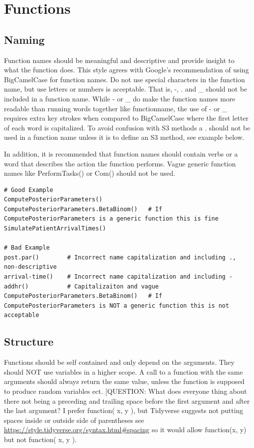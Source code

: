\documentclass[
]{book}
\begin{document}
\hypertarget{functions}{%
\chapter{Functions}\label{functions}}

\hypertarget{naming}{%
\section{Naming}\label{naming}}

Function names should be meaningful and descriptive and provide insight to what the function does. This style agrees with Google's recommendation of using BigCamelCase for function names. Do not use special characters in the function name, but use letters or numbers is acceptable. That is, -, . and \_ should not be included in a function name. While - or \_ do make the function names more readable than running words together like functionname, the use of - or \_ requires extra key strokes when compared to BigCamelCase where the first letter of each word is capitalized. To avoid confusion with S3 methods a . should not be used in a function name unless it is to define an S3 method, see example below.

In addition, it is recommended that function names should contain verbs or a word that describes the action the function performs. Vague generic function names like PerformTasks() or Com() should not be used.

\begin{verbatim}
# Good Example 
ComputePosteriorParameters()
ComputePosteriorParameters.BetaBinom()   # If ComputePosteriorParameters is a generic function this is fine
SimulatePatientArrivalTimes()

# Bad Example
post.par()        # Incorrect name capitalization and including ., non-descriptive
arrival-time()    # Incorrect name capitalization and including -
addhr()           # Capitalizaiton and vague
ComputePosteriorParameters.BetaBinom()   # If ComputePosteriorParameters is NOT a generic function this is not acceptable
\end{verbatim}

\hypertarget{structure}{%
\section{Structure}\label{structure}}

Functions should be self contained and only depend on the arguments. They should NOT use variables in a higher scope. A call
to a function with the same arguments should always return the same value, unless the function is supposed to produce random variables ect.
{[}QUESTION: What does everyone thing about there not being a preceding and trailing space before the first argument and after the last argument? I prefer function( x, y ), but Tidyverse suggests not putting spaces inside or outside side of parentheses see \url{https://style.tidyverse.org/syntax.html\#spacing} so it would allow function(x, y) but not function( x, y ).
\end{document}
